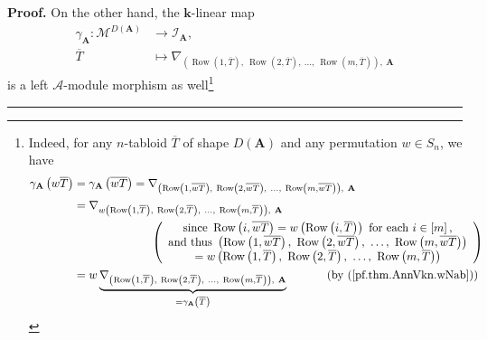 \documentclass[numbers=enddot,12pt,final,onecolumn,notitlepage]{scrartcl}%
\numberwithin{exer}{subsection}
\theoremstyle{definition}
\newenvironment{proof}[1][Proof]{\noindent\textbf{#1.} }{\ \rule{0.5em}{0.5em}}
\begin{document}
\begin{proof}
On the other hand, the $\mathbf{k}$-linear map%
\begin{align*}
\gamma_{\mathbf{A}}:\mathcal{M}^{D\left(  \mathbf{A}\right)  }  &
\rightarrow\mathcal{I}_{\mathbf{A}},\\
\overline{T}  &  \mapsto\nabla_{\left(  \operatorname*{Row}\left(
1,\overline{T}\right)  ,\ \operatorname*{Row}\left(  2,\overline{T}\right)
,\ \ldots,\ \operatorname*{Row}\left(  m,\overline{T}\right)  \right)
,\ \mathbf{A}}%
\end{align*}
is a left $\mathcal{A}$-module morphism as well\footnote{Indeed, for any
$n$-tabloid $\overline{T}$ of shape $D\left(  \mathbf{A}\right)  $ and any
permutation $w\in S_{n}$, we have
\begin{align*}
\gamma_{\mathbf{A}}\left(  w\overline{T}\right)   &  =\gamma_{\mathbf{A}%
}\left(  \overline{wT}\right)  =\nabla_{\left(  \operatorname*{Row}\left(
1,\overline{wT}\right)  ,\ \operatorname*{Row}\left(  2,\overline{wT}\right)
,\ \ldots,\ \operatorname*{Row}\left(  m,\overline{wT}\right)  \right)
,\ \mathbf{A}}\\
&  =\nabla_{w\left(  \operatorname*{Row}\left(  1,\overline{T}\right)
,\ \operatorname*{Row}\left(  2,\overline{T}\right)  ,\ \ldots
,\ \operatorname*{Row}\left(  m,\overline{T}\right)  \right)  ,\ \mathbf{A}}\\
&  \ \ \ \ \ \ \ \ \ \ \ \ \ \ \ \ \ \ \ \ \left(
\begin{array}
[c]{c}%
\text{since }\operatorname*{Row}\left(  i,\overline{wT}\right)  =w\left(
\operatorname*{Row}\left(  i,\overline{T}\right)  \right)  \text{ for each
}i\in\left[  m\right]  \text{,}\\
\text{and thus }\left(  \operatorname*{Row}\left(  1,\overline{wT}\right)
,\ \operatorname*{Row}\left(  2,\overline{wT}\right)  ,\ \ldots
,\ \operatorname*{Row}\left(  m,\overline{wT}\right)  \right) \\
=w\left(  \operatorname*{Row}\left(  1,\overline{T}\right)
,\ \operatorname*{Row}\left(  2,\overline{T}\right)  ,\ \ldots
,\ \operatorname*{Row}\left(  m,\overline{T}\right)  \right)
\end{array}
\right) \\
&  =w\underbrace{\nabla_{\left(  \operatorname*{Row}\left(  1,\overline
{T}\right)  ,\ \operatorname*{Row}\left(  2,\overline{T}\right)
,\ \ldots,\ \operatorname*{Row}\left(  m,\overline{T}\right)  \right)
,\ \mathbf{A}}}_{=\gamma_{\mathbf{A}}\left(  \overline{T}\right)
}\ \ \ \ \ \ \ \ \ \ \left(  \text{by (\ref{pf.thm.AnnVkn.wNab})}\right) \\

\end{align*}}
\end{proof}
\end{document}
